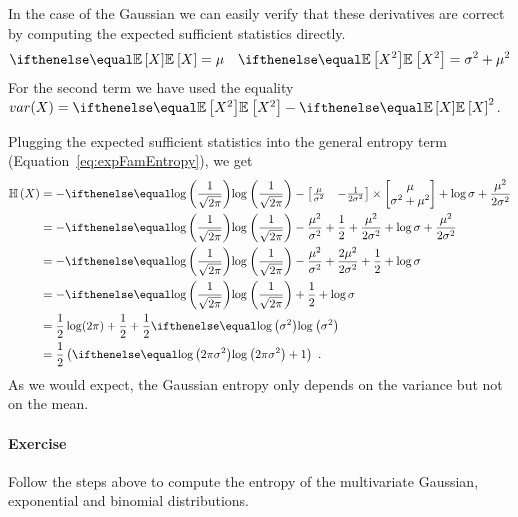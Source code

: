\documentclass[a4paper, 11pt]{article}
\begin{document}
In the case of the Gaussian we can easily verify that these derivatives are correct by computing the expected sufficient statistics
directly.
\begin{align}
\E{X} = \mu && \E{X^{2}} = \sigma^{2} + \mu^{2}
\end{align}
For the second term we have used the equality $ var(X) = \E{X^{2}} - \E{X}^{2} $.

Plugging the expected sufficient statistics into the general entropy term (Equation~\eqref{eq:expFamEntropy}), we get
\begin{subequations}
\begin{align}
\Ent{X} &=- \loga{\frac{1}{\sqrt{2\pi}}} - \begin{bmatrix} \frac{\mu}{\sigma^{2}} & -\frac{1}{2\sigma^{2}} \end{bmatrix} \times 
\begin{bmatrix} \mu \\ \sigma^{2} + \mu^{2} \end{bmatrix} + \log \sigma + \frac{\mu^{2}}{2\sigma^{2}} \\
&= -\loga{\frac{1}{\sqrt{2\pi}}} - \frac{\mu^{2}}{\sigma^{2}} + \frac{1}{2} + \frac{\mu^{2}}{2\sigma^{2}} + \log \sigma + \frac{\mu^{2}}{2\sigma^{2}} \\
&= -\loga{\frac{1}{\sqrt{2\pi}}} - \frac{\mu^{2}}{\sigma^{2}} + \frac{2\mu^{2}}{2\sigma^{2}} + \frac{1}{2} + \log \sigma \\
&= -\loga{\frac{1}{\sqrt{2\pi}}} + \frac{1}{2} + \log \sigma \\
&= \frac{1}{2} \log(2\pi) + \frac{1}{2} + \frac{1}{2} \loga{\sigma^{2}} \\
&= \frac{1}{2} \left(\loga{2\pi\sigma^{2}} + 1\right) \ .
\end{align}
\end{subequations}
As we would expect, the Gaussian entropy only depends on the variance but not on the mean.

\paragraph{Exercise} Follow the steps above to compute the entropy of the multivariate Gaussian, exponential and binomial distributions.
\end{document}
